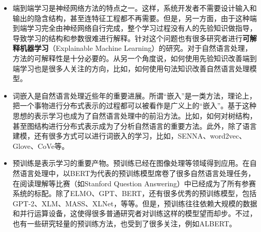 \begin{itemize}
\vspace{0.5em}
\item 端到端学习是神经网络方法的特点之一。这样，系统开发者不需要设计输入和输出的隐含结构，甚至连特征工程都不再需要。但是，另一方面，由于这种端到端学习完全由神经网络自行完成，整个学习过程没有人的先验知识做指导，导致学习的结构和参数很难进行解释。针对这个问题也有很多研究者进行{\small\sffamily\bfseries{可解释机器学习}}（Explainable Machine Learning）的研究\cite{guidotti2018survey}\cite{koh2017understanding}。对于自然语言处理，方法的可解释性是十分必要的。从另一个角度说，如何使用先验知识改善端到端学习也是很多人关注的方向\cite{arthur2016incorporating}\cite{Zhang2017PriorKI}，比如，如何使用句法知识改善自然语言处理模型\cite{zollmann2006syntax}\cite{charniak2003syntax}\cite{stahlberg2016syntactically}。
\vspace{0.5em}
\item 词嵌入是自然语言处理近些年的重要进展。所谓“嵌入”是一类方法，理论上，把一个事物进行分布式表示的过程都可以被看作是广义上的“嵌入”。基于这种思想的表示学习也成为了自然语言处理中的前沿方法。比如，如何对树结构，甚至图结构进行分布式表示\cite{plank2013embedding}\cite{perozzi2014deepwalk}成为了分析自然语言的重要方法。此外，除了语言建模，还有很多方式可以进行词嵌入的学习，比如，SENNA\cite{collobert2011natural}、word2vec\cite{mikolov2013efficient}\cite{mikolov2013distributed}、Glove\cite{pennington2014glove}、CoVe\cite{mccann2017learned}等。
\vspace{0.5em}
\item 预训练是表示学习的重要产物。预训练已经在图像处理等领域得到应用。在自然语言处理中，以BERT为代表的预训练模型席卷了很多自然语言处理任务，在阅读理解等比赛（如Stanford Question Answering）中已经成为了所有参赛系统的标配。除了ELMO、GPT、BERT，还有很多优秀的预训练模型，包括GPT-2\cite{radford2019language}、XLM\cite{lample2019cross}、MASS\cite{song2019mass}、XLNet\cite{yang2019xlnet}，等等。但是，预训练往往依赖大规模的数据和并行运算设备，这使得很多普通研究者对训练这样的模型望而却步。不过，也有一些研究轻量的预训练方法，也受到了很多关注，例如ALBERT\cite{lan2019albert}。
\vspace{0.5em}
\end{itemize}
